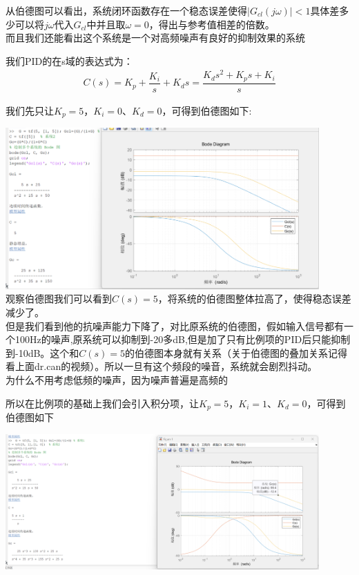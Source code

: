 \documentclass[UTF8,a4paper,12pt]{ctexart}
\begin{document}
\begin{notitlebox}
\begin{flushleft}
      \end{flushleft}
      \begin{flushleft}
        从伯德图可以看出，系统闭环函数存在一个稳态误差使得$|G_{cl}(j\omega)|<1$具体差多少可以将$j\omega$代入$G_{cl}$中并且取$\omega=0$，得出与参考值相差的倍数。\\
        而且我们还能看出这个系统是一个对高频噪声有良好的抑制效果的系统
        
      \end{flushleft}
      \begin{flushleft}
        我们PID的在s域的表达式为：
        \begin{align*}
          C(s)=K_p+\dfrac{K_i}{s}+K_ds=\dfrac{K_ds^2+K_ps+K_i}{s}
        \end{align*}
      \end{flushleft}
      \begin{flushleft}
        我们先只让$K_p=5$，$K_i=0$、$K_d=0$，可得到伯德图如下:
        \par \includegraphics[width=12cm]{picture/C_5.png}\\
        观察伯德图我们可以看到$C(s)=5$，将系统的伯德图整体拉高了，使得稳态误差减少了。\\
        但是我们看到他的抗噪声能力下降了，对比原系统的伯德图，假如输入信号都有一个100Hz的噪声,原系统可以抑制到-20多dB,但是加了只有比例项的PID后只能抑制到-10dB。这个和$C(s)=5$的伯德图本身就有关系（关于伯德图的叠加关系记得看上面dr.can的视频）。所以一旦有这个频段的噪音，系统就会剧烈抖动。\\{\scriptsize 为什么不用考虑低频的噪声，因为噪声普遍是高频的}
      \end{flushleft}
      \vspace{1cm}
      \begin{flushleft}
        所以在比例项的基础上我们会引入积分项，让$K_p=5$，$K_i=1$、$K_d=0$，可得到伯德图如下
        \par \includegraphics[width=12cm]{picture/C_5_I_1.png}

\end{flushleft}
\end{notitlebox}
\end{document}
